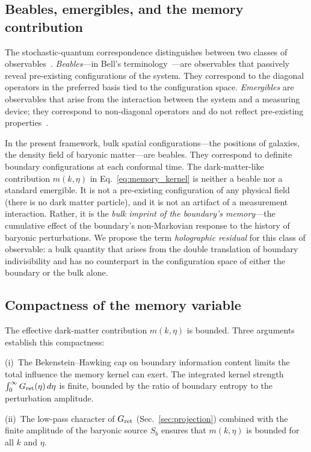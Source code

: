 \documentclass[aps,prd,twocolumn,superscriptaddress,nofootinbib]{revtex4-2}
\begin{document}
\subsection{Beables, emergibles, and the memory contribution}

The stochastic-quantum correspondence distinguishes between two classes of observables~\cite{Barandes2025QSIP}. \emph{Beables}---in Bell's terminology~\cite{Bell1982}---are observables that passively reveal pre-existing configurations of the system. They correspond to the diagonal operators in the preferred basis tied to the configuration space. \emph{Emergibles} are observables that arise from the interaction between the system and a measuring device; they correspond to non-diagonal operators and do not reflect pre-existing properties~\cite{Barandes2025QSIP,DaumerDurrGoldsteinZanghi1996}.

In the present framework, bulk spatial configurations---the positions of galaxies, the density field of baryonic matter---are beables. They correspond to definite boundary configurations at each conformal time. The dark-matter-like contribution $m(k,\eta)$ in Eq.~\eqref{eq:memory_kernel} is neither a beable nor a standard emergible. It is not a pre-existing configuration of any physical field (there is no dark matter particle), and it is not an artifact of a measurement interaction. Rather, it is the \emph{bulk imprint of the boundary's memory}---the cumulative effect of the boundary's non-Markovian response to the history of baryonic perturbations. We propose the term \emph{holographic residual} for this class of observable: a bulk quantity that arises from the double translation of boundary indivisibility and has no counterpart in the configuration space of either the boundary or the bulk alone.

\subsection{Compactness of the memory variable}

The effective dark-matter contribution $m(k,\eta)$ is bounded. Three arguments establish this compactness:

(i)~The Bekenstein--Hawking cap on boundary information content limits the total influence the memory kernel can exert. The integrated kernel strength $\int_0^{\infty} G_{\rm ret}(\eta)\, d\eta$ is finite, bounded by the ratio of boundary entropy to the perturbation amplitude.

(ii)~The low-pass character of $G_{\rm ret}$ (Sec.~\ref{sec:projection}) combined with the finite amplitude of the baryonic source $S_b$ ensures that $m(k,\eta)$ is bounded for all $k$ and $\eta$.
\end{document}
